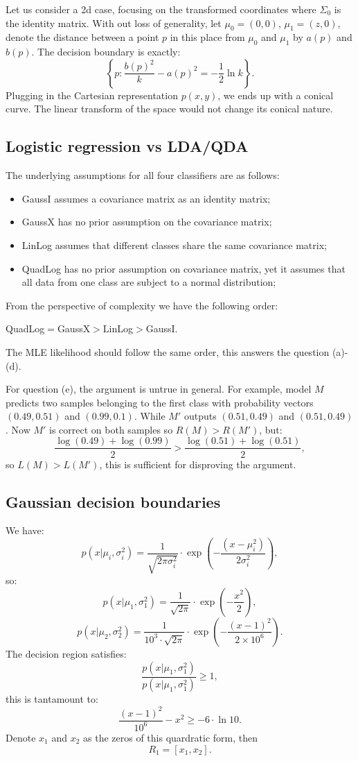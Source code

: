 \documentclass[UTF8]{ctexart}
\begin{document}
Let us consider a 2d case, focusing on the transformed coordinates where $\Sigma_{0}$ is the identity matrix.
With out loss of generality, let $\mu_{0}=(0,0)$, $\mu_{1}=(z,0)$, denote the distance between a point $p$ in this place from $\mu_{0}$ and $\mu_{1}$ by $a(p)$ and $b(p)$.
The decision boundary is exactly:
$$\left\{p:\frac{b(p)^{2}}{k}-a(p)^{2}=-\frac{1}{2}\ln k \right\}.$$
Plugging in the Cartesian representation $p(x,y)$, we ends up with a conical curve.
The linear transform of the space would not change its conical nature.

\subsection{Logistic regression vs LDA/QDA}
The underlying assumptions for all four classifiers are as follows:
\begin{itemize}
\item GaussI assumes a covariance matrix as an identity matrix;
\item GaussX has no prior assumption on the covariance matrix;
\item LinLog assumes that different classes share the same covariance matrix;
\item QuadLog has no prior assumption on covariance matrix, yet it assumes that all data from one class are subject to a normal distribution;
\end{itemize}
From the perspective of complexity we have the following order:

QuadLog$=$GaussX$>$LinLog$>$GaussI.

The MLE likelihood should follow the same order, this answers the question (a)-(d).

For question (e), the argument is untrue in general.
For example, model $M$ predicts two samples belonging to the first class with probability vectors $(0.49,0.51)$ and $(0.99,0.1)$.
While $M'$ outputs $(0.51,0.49)$ and $(0.51,0.49)$.
Now $M'$ is correct on both samples so $R(M)>R(M')$, but:
$$\frac{\log (0.49)+\log (0.99)}{2} > \frac{\log (0.51)+\log (0.51)}{2},$$
so $L(M)>L(M')$, this is sufficient for disproving the argument.

\subsection{Gaussian decision boundaries}
We have:
$$p(x|\mu_{i},\sigma^{2}_{i})=\frac{1}{\sqrt{2\pi\sigma^{2}_{i}}}\cdot\exp\left( -\frac{(x-\mu_{i}^{2})}{2\sigma^{2}_{i}}\right),$$
so:
$$p(x|\mu_{1},\sigma^{2}_{1})=\frac{1}{\sqrt{2\pi}}\cdot\exp\left(-\frac{x^{2}}{2} \right),$$
$$p(x|\mu_{2},\sigma^{2}_{2})=\frac{1}{10^{3}\cdot\sqrt{2\pi}}\cdot\exp\left(-\frac{(x-1)^{2}}{2\times 10^{6}} \right).$$
The decision region satisfies:
$$\frac{p(x|\mu_{1},\sigma^{2}_{1})}{p(x|\mu_{1},\sigma^{2}_{1})}\geq 1,$$
this is tantamount to:
$$\frac{(x-1)^{2}}{10^{6}}-x^{2}\geq -6\cdot \ln 10.$$
Denote $x_{1}$ and $x_{2}$ as the zeros of this quardratic form, then
$$R_{1}=[x_{1},x_{2}].$$
\end{document}
